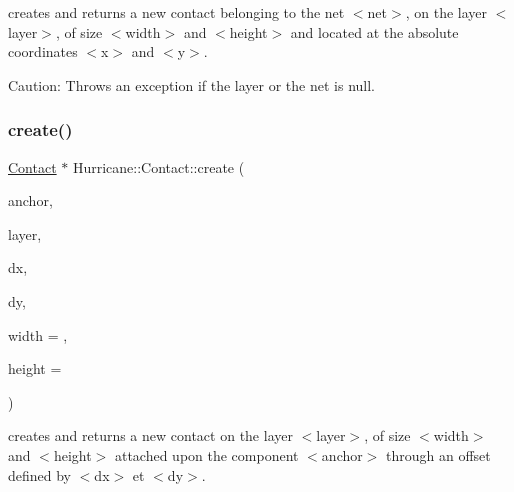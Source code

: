 creates and returns a new contact belonging to the net {\ttfamily $<$net$>$}, on the layer {\ttfamily $<$layer$>$}, of size {\ttfamily $<$width$>$} and {\ttfamily $<$height$>$} and located at the absolute coordinates {\ttfamily $<$x$>$} and {\ttfamily $<$y$>$}.

\begin{DoxyParagraph}{Caution\+: Throws an exception if the layer or the net is null. }

\end{DoxyParagraph}
\mbox{\label{classHurricane_1_1Contact_a6645345f819cb4769fac075a0b1ea028}} 
\subsubsection{\texorpdfstring{create()}{create()}\hspace{0.1cm}{\footnotesize\ttfamily [2/2]}}
{\footnotesize\ttfamily \mbox{\hyperlink{classHurricane_1_1Contact}{Contact}} $\ast$ Hurricane\+::\+Contact\+::create (\begin{DoxyParamCaption}\item[{\mbox{\hyperlink{classHurricane_1_1Component}{Component}} $\ast$}]{anchor,  }\item[{const \mbox{\hyperlink{classHurricane_1_1Layer}{Layer}} $\ast$}]{layer,  }\item[{const \mbox{\hyperlink{group__DbUGroup_ga4fbfa3e8c89347af76c9628ea06c4146}{Db\+U\+::\+Unit}} \&}]{dx,  }\item[{const \mbox{\hyperlink{group__DbUGroup_ga4fbfa3e8c89347af76c9628ea06c4146}{Db\+U\+::\+Unit}} \&}]{dy,  }\item[{const \mbox{\hyperlink{group__DbUGroup_ga4fbfa3e8c89347af76c9628ea06c4146}{Db\+U\+::\+Unit}} \&}]{width = {},  }\item[{const \mbox{\hyperlink{group__DbUGroup_ga4fbfa3e8c89347af76c9628ea06c4146}{Db\+U\+::\+Unit}} \&}]{height = {} }\end{DoxyParamCaption})\hspace{0.3cm}{\ttfamily [static]}}

creates and returns a new contact on the layer {\ttfamily $<$layer$>$}, of size {\ttfamily $<$width$>$} and {\ttfamily $<$height$>$} attached upon the component {\ttfamily $<$anchor$>$} through an offset defined by {\ttfamily $<$dx$>$} et {\ttfamily $<$dy$>$}.

